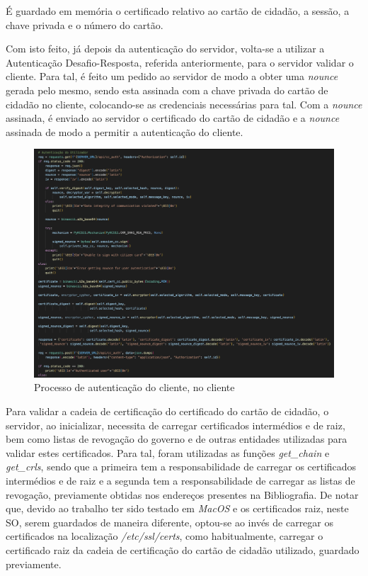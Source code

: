 \documentclass[10pt,english]{article}
\begin{document}
\par É guardado em memória o certificado relativo ao cartão de cidadão, a sessão, a chave privada e o número do cartão.

\clearpage

\par Com isto feito, já depois da autenticação do servidor, volta-se a utilizar a Autenticação Desafio-Resposta, referida anteriormente, para o servidor validar o cliente. Para tal, é feito um pedido ao servidor de modo a obter uma \textit{nounce} gerada pelo mesmo, sendo esta assinada com a chave privada do cartão de cidadão no cliente, colocando-se as credenciais necessárias para tal. Com a \textit{nounce} assinada, é enviado ao servidor o certificado do cartão de cidadão e a \textit{nounce} assinada de modo a permitir a autenticação do cliente.

\begin{figure}[!h]
        \centering
        \includegraphics[width=\textwidth]{images/cc_auth_client.png}
        \caption{Processo de autenticação do cliente, no cliente}
\end{figure}

\clearpage

\par Para validar a cadeia de certificação do certificado do cartão de cidadão, o servidor, ao inicializar, necessita de carregar certificados intermédios e de raiz, bem como listas de revogação do governo e de outras entidades utilizadas para validar estes certificados. Para tal, foram utilizadas as funções \textit{get\_chain} e \textit{get\_crls}, sendo que a primeira tem a responsabilidade de carregar os certificados intermédios e de raiz e a segunda tem a responsabilidade de carregar as listas de revogação, previamente obtidas nos endereços presentes na Bibliografia. De notar que, devido ao trabalho ter sido testado em \textit{MacOS} e os certificados raiz, neste SO, serem guardados de maneira diferente, optou-se ao invés de carregar os certificados na localização \textit{/etc/ssl/certs}, como habitualmente, carregar o certificado raiz da cadeia de certificação do cartão de cidadão utilizado, guardado previamente.
\end{document}
